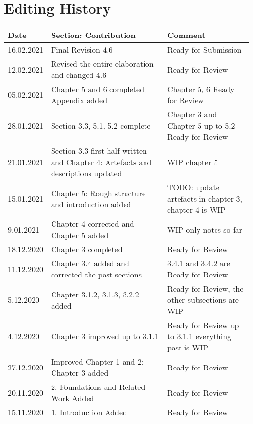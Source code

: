 \cleardoublepage
{}
\chapter*{Editing History}
\label{cha:history}


\begin{longtable}{ |p{2cm}|p{5.5cm}|p{6cm}|}
    \hline
      Date & Section: Contribution & Comment \\
      \hline
        16.02.2021 & Final Revision 4.6 & Ready for Submission\\
      \hline
        12.02.2021 & Revised the entire elaboration and changed 4.6 & Ready for Review\\
      \hline
        05.02.2021 & Chapter 5 and 6 completed, Appendix added & Chapter 5, 6 Ready for Review\\
      \hline
        28.01.2021 & Section 3.3, 5.1, 5.2 complete & Chapter 3  and Chapter 5 up to 5.2 Ready for Review\\
      \hline
        21.01.2021 & Section 3.3 first half written and Chapter 4: Artefacts and descriptions updated & WIP chapter 5\\
      \hline
        15.01.2021 & Chapter 5: Rough structure and introduction added & TODO: update artefacts in chapter 3, chapter 4 is WIP\\
      \hline
        9.01.2021 & Chapter 4 corrected and Chapter 5 added & WIP only notes so far\\
      \hline
        18.12.2020 & Chapter 3 completed & Ready for Review\\
      \hline
        11.12.2020 & Chapter 3.4 added and corrected the past sections & 3.4.1 and 3.4.2 are Ready for Review\\
      \hline
        5.12.2020 & Chapter 3.1.2, 3.1.3, 3.2.2 added & Ready for Review, the other subsections are WIP\\
      \hline
        4.12.2020 & Chapter 3 improved up to 3.1.1 & Ready for Review up to 3.1.1 everything past is WIP\\
     \hline
        27.12.2020 & Improved Chapter 1 and 2; Chapter 3 added & Ready for Review \\
     \hline
        20.11.2020 & 2. Foundations and Related Work Added & Ready for Review\\
     \hline
        15.11.2020 & 1. Introduction Added& Ready for Review \\
     \hline
\end{longtable}
